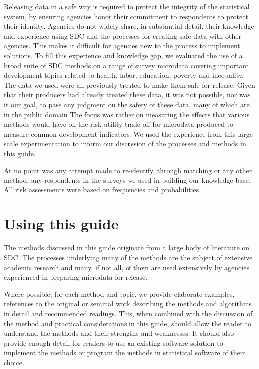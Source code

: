 \documentclass[letterpaper,10pt,english]{sphinxmanual}
\begin{document}
Releasing data in a safe way is required to protect the integrity of the
statistical system, by ensuring agencies honor their commitment to
respondents to protect their identity. Agencies do not widely share, in
substantial detail, their knowledge and experience using SDC and the
processes for creating safe data with other agencies. This makes it
difficult for agencies new to the process to implement solutions. To
fill this experience and knowledge gap, we evaluated the use of a broad
suite of SDC methods on a range of survey microdata covering important
development topics related to health, labor, education, poverty and
inequality. The data we used were all previously treated to make them
safe for release. Given that their producers had already treated these
data, it was not possible, nor was it our goal, to pass any judgment on
the safety of these data, many of which are in the public domain The
focus was rather on measuring the effects that various methods would
have on the risk-utility trade-off for microdata produced to measure
common development indicators. We used the experience from this
large-scale experimentation to inform our discussion of the processes
and methods in this guide.

 At no point was any attempt made to re-identify, through
matching or any other method, any respondents in the surveys we used in
building our knowledge base. All risk assessments were based on
frequencies and probabilities.


\section{Using this guide}
\label{\detokenize{intro:using-this-guide}}
The methods discussed in this guide originate from a large body of
literature on SDC. The processes underlying many of the methods are the
subject of extensive academic research and many, if not all, of them are
used extensively by agencies experienced in preparing microdata for
release.

Where possible, for each method and topic, we provide elaborate
examples, references to the original or seminal work describing the
methods and algorithms in detail and recommended readings. This, when
combined with the discussion of the method and practical considerations
in this guide, should allow the reader to understand the methods and
their strengths and weaknesses. It should also provide enough detail for
readers to use an existing software solution to implement the methods or
program the methods in statistical software of their choice.
\end{document}
